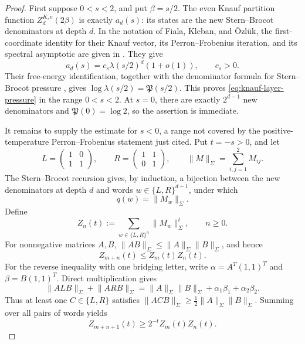 \begin{proof}
First suppose \(0<s<2\), and put \(\beta=s/2\).  The even Knauf
partition function \(Z^{K,e}_d(2\beta)\) is exactly \(a_d(s)\): its
states are the new Stern--Brocot denominators at depth \(d\).  In the
notation of Fiala, Kleban, and \"Ozl\"uk, the first-coordinate identity
for their Knauf vector, its Perron--Frobenius iteration, and its spectral
asymptotic are given in
\cite[Sec.~IV, especially Eqs.~(23), (26), and (28)]{FialaKlebanOzluk2003}.
They give
\[
 a_d(s)=c_s\lambda(s/2)^d(1+o(1)),\qquad c_s>0.
\]
Their free-energy identification, together with the denominator formula
for Stern--Brocot pressure
\cite[Thm.~1.1 and the denominator formula in Sec.~2]{KessebohmerStratmann2007},
gives \(\log\lambda(s/2)=\mathfrak P(s/2)\).  This proves
\eqref{eq:knauf-layer-pressure} in the range \(0<s<2\).  At \(s=0\),
there are exactly \(2^{d-1}\) new denominators and
\(\mathfrak P(0)=\log2\), so the assertion is immediate.

It remains to supply the estimate for \(s<0\), a range not covered by
the positive-temperature Perron--Frobenius statement just cited.  Put
\(t=-s>0\), and let
\[
 L=\begin{pmatrix}1&0\\1&1\end{pmatrix},\qquad
 R=\begin{pmatrix}1&1\\0&1\end{pmatrix},\qquad
 \lVert M\rVert_\Sigma=\sum_{i,j=1}^2M_{ij}.
\]
The Stern--Brocot recursion gives, by induction, a bijection between the
new denominators at depth \(d\) and words \(w\in\{L,R\}^{d-1}\), under
which
\begin{equation}
 q(w)=\lVert M_w\rVert_\Sigma.
 \label{eq:stern-brocot-matrix-denominator}
\end{equation}
Define
\[
 Z_n(t):=\sum_{w\in\{L,R\}^n}\lVert M_w\rVert_\Sigma^t,
 \qquad n\ge0.
\]
For nonnegative matrices \(A,B\),
\(\lVert AB\rVert_\Sigma\le
\lVert A\rVert_\Sigma\lVert B\rVert_\Sigma\), and hence
\begin{equation}
 Z_{m+n}(t)\le Z_m(t)Z_n(t).
 \label{eq:matrix-partition-submultiplicative}
\end{equation}
For the reverse inequality with one bridging letter, write
\(\alpha=A^T(1,1)^T\) and \(\beta=B(1,1)^T\).  Direct multiplication gives
\[
 \lVert ALB\rVert_\Sigma+\lVert ARB\rVert_\Sigma
 =\lVert A\rVert_\Sigma\lVert B\rVert_\Sigma
   +\alpha_1\beta_1+\alpha_2\beta_2.
\]
Thus at least one \(C\in\{L,R\}\) satisfies
\(\lVert ACB\rVert_\Sigma\ge
\frac12\lVert A\rVert_\Sigma\lVert B\rVert_\Sigma\).  Summing over
all pairs of words yields
\begin{equation}
 Z_{m+n+1}(t)\ge2^{-t}Z_m(t)Z_n(t).
 \label{eq:matrix-partition-bridged}
\end{equation}


\end{proof}
